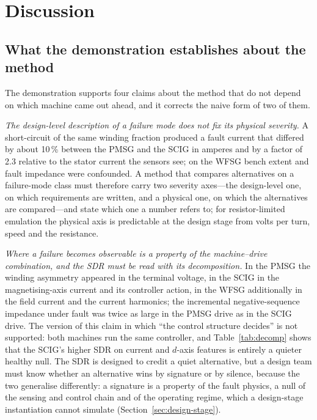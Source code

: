 \section{Discussion}\label{sec:discussion}

\subsection{What the demonstration establishes about the method}

The demonstration supports four claims about the method that do not depend on which machine came out ahead, and it corrects the naive form of two of them.

\emph{The design-level description of a failure mode does not fix its physical severity.} A short-circuit of the same winding fraction produced a fault current that differed by about 10\,\% between the PMSG and the SCIG in amperes and by a factor of 2.3 relative to the stator current the sensors see; on the WFSG bench extent and fault impedance were confounded. A method that compares alternatives on a failure-mode class must therefore carry two severity axes---the design-level one, on which requirements are written, and a physical one, on which the alternatives are compared---and state which one a number refers to; for resistor-limited emulation the physical axis is predictable at the design stage from volts per turn, speed and the resistance.

\emph{Where a failure becomes observable is a property of the machine--drive combination, and the SDR must be read with its decomposition.} In the PMSG the winding asymmetry appeared in the terminal voltage, in the SCIG in the magnetising-axis current and its controller action, in the WFSG additionally in the field current and the current harmonics; the incremental negative-sequence impedance under fault was twice as large in the PMSG drive as in the SCIG drive. The version of this claim in which ``the control structure decides'' is not supported: both machines run the same controller, and Table~\ref{tab:decomp} shows that the SCIG's higher SDR on current and $d$-axis features is entirely a quieter healthy null. The SDR is designed to credit a quiet alternative, but a design team must know whether an alternative wins by signature or by silence, because the two generalise differently: a signature is a property of the fault physics, a null of the sensing and control chain and of the operating regime, which a design-stage instantiation cannot simulate (Section~\ref{sec:design-stage}).

